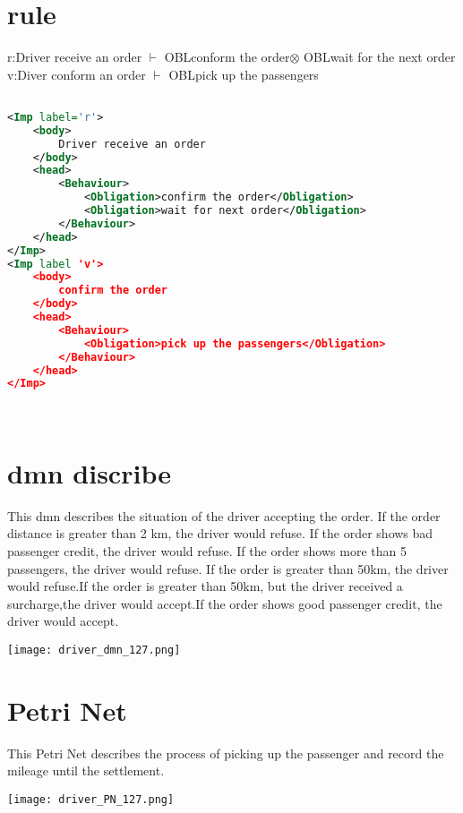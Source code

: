 \documentclass[runningheads]{llncs}
\begin{document}
\section{rule}
r:Driver receive an order $\vdash$ OBLconform the order$\otimes$ OBLwait for the next order\\
v:Diver conform an order $\vdash$ OBLpick up the passengers

\begin{lstlisting}[language={xml}]	%代码段语句

<Imp label='r'>
	<body>
		Driver receive an order
	</body>
	<head>
		<Behaviour>
			<Obligation>confirm the order</Obligation>
			<Obligation>wait for next order</Obligation>
		</Behaviour>
	</head>
</Imp>
<Imp label 'v'>
	<body>
		confirm the order
	</body>
	<head>
		<Behaviour>
			<Obligation>pick up the passengers</Obligation>
		</Behaviour>
	</head>
</Imp>




\end{lstlisting}


\section{dmn discribe}
This dmn describes the situation of the driver accepting the order. If the order distance is greater than 2 km, the driver would refuse. If the order shows bad passenger credit, the driver would refuse. If the order shows more than 5 passengers, the driver would refuse. If the order is greater than 50km, the driver would refuse.If the order is greater than 50km, but the driver received a surcharge,the driver would accept.If the order shows good passenger credit, the driver would accept.\\

\centerline{\texttt{[image: driver\_dmn\_127.png]}}


\section{Petri Net}
This Petri Net describes the process of picking up the passenger and record the mileage until the settlement.\\

\centerline{\texttt{[image: driver\_PN\_127.png]}}
\end{document}
